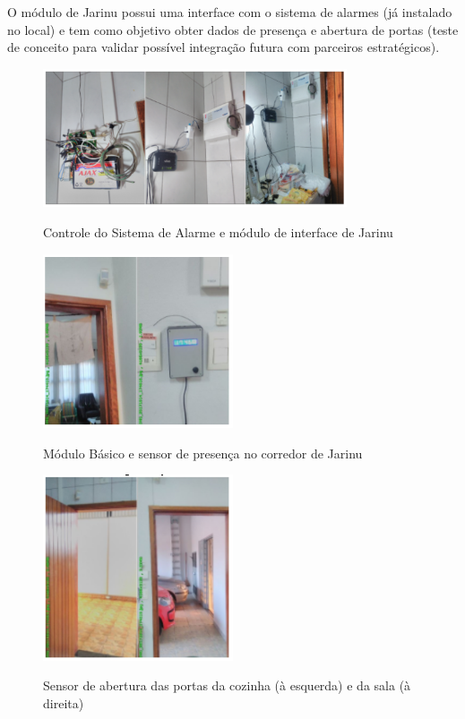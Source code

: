 O módulo de Jarinu possui uma interface com o sistema de alarmes (já instalado no local) e tem como objetivo obter dados de presença e abertura de portas (teste de conceito para validar possível integração futura com parceiros estratégicos).

\begin{figure}[H]
	\centering
	\caption{Controle do Sistema de Alarme e módulo de interface de Jarinu}
	\includegraphics[width=0.8\textwidth]{ModuloSistAlarme}
	\label{fig:ModuloSistAlarme}
\end{figure}

\begin{figure}[H]
	\centering
	\caption{Módulo Básico e sensor de presença no corredor de Jarinu}
	\includegraphics[width=0.5\textwidth]{BasicSensorPresJarinu}
	\label{fig:BasicSensorPresJarinu}
\end{figure}

\begin{figure}[H]
	\centering
	\caption{Sensor de abertura das portas da cozinha (à esquerda) e da sala (à direita)}
	\includegraphics[width=0.5\textwidth]{SensorPortasJarinu}
	\label{fig:SensorPortasJarinu}
\end{figure}

